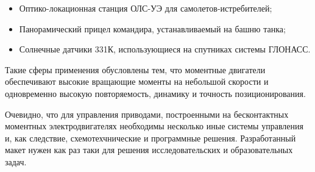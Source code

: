 \begin{itemize}
  \item Оптико-локационная станция ОЛС-УЭ для самолетов-истребителей;

  \item Панорамический прицел командира, устанавливаемый на башню танка;

  \item Солнечные датчики 331К, использующиеся на спутниках системы ГЛОНАСС.
\end{itemize}

Такие сферы применения обусловлены тем, что моментные двигатели обеспечивают
высокие вращающие моменты на небольшой скорости и одновременно высокую 
повторяемость, динамику и точность позиционирования. 

Очевидно, что для управления приводами, построенными на бесконтактных моментных
электродвигателях необходимы несколько иные системы управления и, как следствие, 
схемотехчнические и программные решения. Разработанный макет нужен как раз таки для
решения исследовательских и образовательных задач.